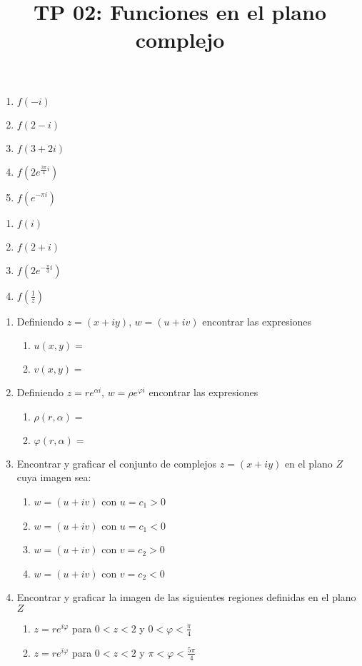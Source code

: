 \documentclass[12pt]{article}
\title{TP 02: Funciones en el plano complejo}
\begin{document}
 
\let\>=\rangle
\let\<=\langle
\let\pe=\preccurlyeq
\let\minus=\smallsetminus
\let\phi=\varphi
\let\w=\omega
\let\a=\alpha
\let\b=\beta
\def\Z{{\mathbb Z}}
\let\iff=\leftrightarrow
\let\Iff=\Leftrightarrow

  \begin{enumerate}
  \item $f(-i)$
  \item $f(2-i)$
  \item $f(3+2i)$
  \item $f(2e^{\frac{3\pi}{4}i})$
  \item $f(e^{-\pi i})$
  \end{enumerate}

\begin{enumerate}
\item $f(i)$
\item $f(2+i)$
\item $f(2e^{-\frac{\pi}{3}i})$
\item $f(\frac{1}{z})$
\end{enumerate}

\begin{enumerate}
\item Definiendo $z=(x+iy)$, $w=(u+iv)$ encontrar las expresiones
\begin{enumerate}
\item $u(x,y)=$
\item $v(x,y)=$
\end{enumerate}
\item Definiendo $z=re^{\alpha i}$, $w=\rho e^{\varphi i}$ encontrar las expresiones
\begin{enumerate}
\item $\rho(r,\alpha)=$
\item $\varphi(r,\alpha)=$
\end{enumerate}
\item Encontrar y graficar el conjunto de complejos $z=(x+iy)$ en el plano $Z$ cuya imagen sea:
\begin{enumerate}
\item $w=(u+iv)$ con $u=c_1 > 0$
\item $w=(u+iv)$ con $u=c_1 < 0$
\item $w=(u+iv)$ con $v=c_2 > 0$
\item $w=(u+iv)$ con $v=c_2 < 0$
\end{enumerate}
\item Encontrar y graficar la imagen de las siguientes regiones definidas en el plano $Z$
\begin{enumerate}
\item $z=re^{i\phi}$ para $0<z<2$ y $ 0<\phi< \frac{\pi}{4}$
\item $z=re^{i\phi}$ para $0<z<2$ y $ \pi<\phi< \frac{5\pi}{4}$
\end{enumerate}
\end{enumerate}
\end{document}
